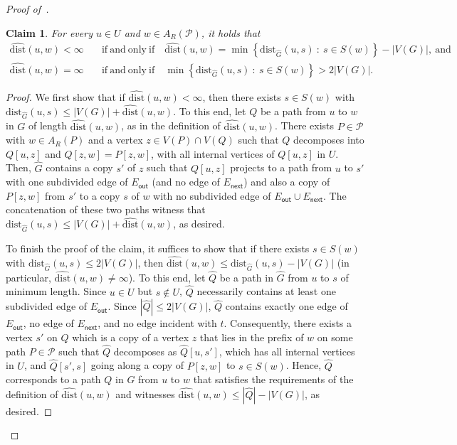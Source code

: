 \documentclass[11pt,a4paper]{article}
\newtheorem{claim}{Claim}[section]
\newcommand{\dist}{\mathrm{dist}}
\renewcommand{\leq}{\leqslant}
\begin{document}
\begin{proof}[Proof of~]
  \begin{claim}\label{cl:dist2}
    For every $u \in U$ and $w \in A_R(\mathcal{P})$, it holds that
    \begin{align*}
    \widehat{\dist}(u,w) < \infty &\quad\mathrm{if\ and\ only\ if} \quad \widehat{\dist}(u,w) = \min\left\{\dist_{\widehat{G}}(u,s)~\colon~s \in S(w)\right\}-|V(G)|,\ \mathrm{and}\\
    \widehat{\dist}(u,w) = \infty &\quad\mathrm{if\ and\ only\ if} \quad \min\left\{\dist_{\widehat{G}}(u,s)~\colon~s \in S(w)\right\} > 2|V(G)|.
    \end{align*}
  \end{claim}
  \begin{proof}
    We first show that if $\widehat{\dist}(u,w) < \infty$, then 
    there exists $s \in S(w)$ with $\dist_{\widehat{G}}(u,s) \leq |V(G)| + \widehat{\dist}(u,w)$. 
    To this end, let $Q$ be a path from $u$ to $w$ in $G$ of length $\widehat{\dist}(u,w)$, as in the definition
    of $\widehat{\dist}(u,w)$. There exists $P \in \mathcal{P}$ with $w \in A_R(P)$ and a vertex $z \in V(P) \cap V(Q)$
    such that $Q$ decomposes into $Q[u,z]$ and $Q[z,w] = P[z,w]$, with all internal vertices of $Q[u,z]$ in $U$. 
    Then, $\widehat{G}$ contains a copy $s'$ of $z$ such that $Q[u,z]$ projects to a path from $u$ to $s'$
    with one subdivided edge of $E_{\mathsf{out}}$ (and no edge of $E_{\mathsf{next}}$) and also a copy of $P[z,w]$ from $s'$
    to a copy $s$ of $w$ with no subdivided edge of $E_{\mathsf{out}} \cup E_{\mathsf{next}}$.
    The concatenation of these two paths witness that $\dist_{\widehat{G}}(u,s) \leq |V(G)| + \widehat{\dist}(u,w)$, as desired.

    To finish the proof of the claim, it suffices to show that if there exists $s \in S(w)$ with
    $\dist_{\widehat{G}}(u,s) \leq 2|V(G)|$, then $\widehat{\dist}(u,w) \leq \dist_{\widehat{G}}(u,s) - |V(G)|$
    (in particular, $\widehat{\dist}(u,w) \neq \infty$).
    To this end, let $\widehat{Q}$ be a path in $\widehat{G}$ from $u$ to $s$ of minimum length. 
    Since $u \in U$ but $s \notin U$, $\widehat{Q}$ necessarily contains at least one subdivided edge of $E_{\mathsf{out}}$. 
    Since $|\widehat{Q}| \leq 2|V(G)|$, $\widehat{Q}$ contains exactly one edge of $E_{\mathsf{out}}$, no edge of 
    $E_{\mathsf{next}}$, and no edge incident with $t$. Consequently, there exists a vertex $s'$ on $\widehat{Q}$
    which is a copy of a vertex $z$ that lies in the prefix of $w$ on some path $P \in \mathcal{P}$ such that 
    $\widehat{Q}$ decomposes as $\widehat{Q}[u,s']$, which has all internal vertices in $U$, and $\widehat{Q}[s',s]$
    going along a copy of $P[z,w]$ to $s \in S(w)$. Hence, $\widehat{Q}$ corresponds to a path $Q$ in $G$
    from $u$ to $w$ that satisfies the requirements of the definition of $\widehat{\dist}(u,w)$
    and witnesses $\widehat{\dist}(u,w) \leq |\widehat{Q}| - |V(G)|$, as desired. 


\end{proof}
\end{proof}
\end{document}
